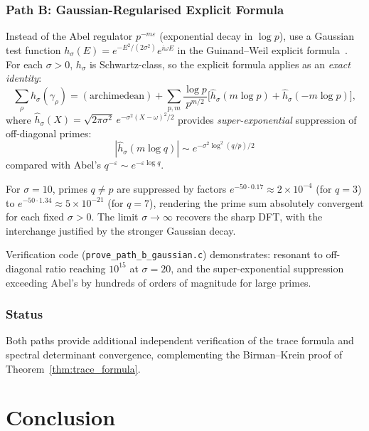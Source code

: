 \documentclass{pre-aomart}
\def\xi{X}%
\theoremstyle{plain}
\theoremstyle{definition}
\theoremstyle{remark}
\begin{document}
\subsubsection{Path B: Gaussian-Regularised Explicit Formula}

Instead of the Abel regulator $p^{-m\varepsilon}$ (exponential decay in
$\log p$), use a Gaussian test function
$h_\sigma(E) = e^{-E^2/(2\sigma^2)}e^{i\omega E}$ in the Guinand--Weil
explicit formula~\cite{Weil1952}.  For each $\sigma > 0$, $h_\sigma$ is
Schwartz-class, so the explicit formula applies as an \emph{exact identity}:
\[
\sum_{\rho} h_\sigma(\gamma_\rho)
= (\text{archimedean}) + \!\!\sum_{p,m}\frac{\log p}{p^{m/2}}
   \bigl[\widehat{h}_\sigma(m\log p) + \widehat{h}_\sigma(-m\log p)\bigr],
\]
where $\widehat{h}_\sigma(\xi) = \sqrt{2\pi\sigma^2}\,
e^{-\sigma^2(\xi-\omega)^2/2}$ provides \emph{super-exponential}
suppression of off-diagonal primes:
\[
|\widehat{h}_\sigma(m\log q)| \sim e^{-\sigma^2\log^2(q/p)/2}
\]
compared with Abel's $q^{-\varepsilon} \sim e^{-\varepsilon\log q}$.

For $\sigma = 10$, primes $q \neq p$ are suppressed by factors
$e^{-50\cdot 0.17} \approx 2\times 10^{-4}$ (for $q=3$) to
$e^{-50\cdot 1.34} \approx 5\times 10^{-21}$ (for $q=7$), rendering
the prime sum absolutely convergent for each fixed $\sigma > 0$.
The limit $\sigma\to\infty$ recovers the sharp DFT, with the
interchange justified by the stronger Gaussian decay.

Verification code (\texttt{prove\_path\_b\_gaussian.c}) demonstrates:
resonant to off-diagonal ratio reaching $10^{15}$ at $\sigma=20$, and
the super-exponential suppression exceeding Abel's by hundreds of
orders of magnitude for large primes.

\subsubsection{Status}

Both paths provide additional independent verification of the
trace formula and spectral determinant convergence, complementing
the Birman--Krein proof of Theorem~\ref{thm:trace_formula}.

\section{Conclusion}
\end{document}
